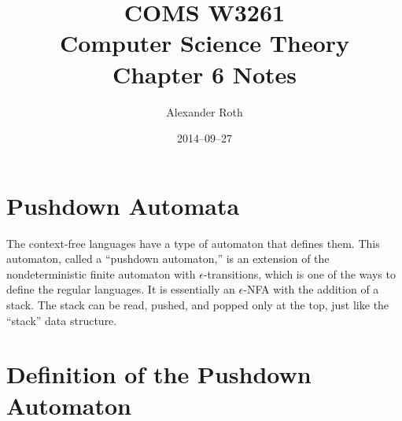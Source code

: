 \documentclass[]{article}
\begin{document}
\title{COMS W3261 \\ Computer Science Theory \\ Chapter 6 Notes}
\author{Alexander Roth}
\date{2014--09--27}
\maketitle
\theoremstyle{definition}
\newtheorem{thm}{Theorem}

\section*{Pushdown Automata}
  The context-free languages have a type of automaton that defines them. This
  automaton, called a ``pushdown automaton,'' is an extension of the
  nondeterministic finite automaton with $\epsilon$-transitions, which is one of
  the ways to define the regular languages. It is essentially an $\epsilon$-NFA
  with the addition of a stack. The stack can be read, pushed, and popped only
  at the top, just like the ``stack'' data structure.

\section*{Definition of the Pushdown Automaton}
\end{document}
